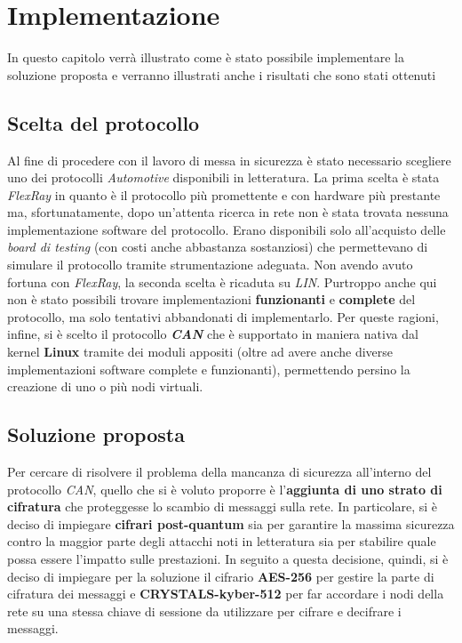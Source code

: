\chapter{Implementazione} %
%

\begin{citazione}
In questo capitolo verrà illustrato come è stato possibile implementare la soluzione proposta e verranno illustrati anche i risultati che sono stati ottenuti
\end{citazione}

\section{Scelta del protocollo}
Al fine di procedere con il lavoro di messa in sicurezza è stato necessario scegliere uno dei protocolli \emph{Automotive} disponibili in letteratura. La prima scelta è stata \emph{FlexRay} in quanto è il protocollo più promettente e con hardware più prestante ma, sfortunatamente, dopo un'attenta ricerca in rete non è stata trovata nessuna implementazione software del protocollo. Erano disponibili solo all'acquisto delle \emph{board di testing} (con costi anche abbastanza sostanziosi) che permettevano di simulare il protocollo tramite strumentazione adeguata. Non avendo avuto fortuna con \emph{FlexRay}, la seconda scelta è ricaduta su \emph{LIN}. Purtroppo anche qui non è stato possibili trovare implementazioni \textbf{funzionanti} e \textbf{complete} del protocollo, ma solo tentativi abbandonati di implementarlo. Per queste ragioni, infine, si è scelto il protocollo \textbf{\emph{CAN}} che è supportato in maniera nativa dal kernel \textbf{Linux} tramite dei moduli appositi (oltre ad avere anche diverse implementazioni software complete e funzionanti), permettendo persino la creazione di uno o più nodi virtuali.

\section{Soluzione proposta}
Per cercare di risolvere il problema della mancanza di sicurezza all'interno del protocollo \emph{CAN}, quello che si è voluto proporre è l'\textbf{aggiunta di uno strato di cifratura} che proteggesse lo scambio di messaggi sulla rete. In particolare, si è deciso di impiegare \textbf{cifrari post-quantum} sia per garantire la massima sicurezza contro la maggior parte degli attacchi noti in letteratura sia per stabilire quale possa essere l'impatto sulle prestazioni. In seguito a questa decisione, quindi, si è deciso di impiegare per la soluzione il cifrario \textbf{AES-256} per gestire la parte di cifratura dei messaggi e \textbf{CRYSTALS-kyber-512} per far accordare i nodi della rete su una stessa chiave di sessione da utilizzare per cifrare e decifrare i messaggi.

